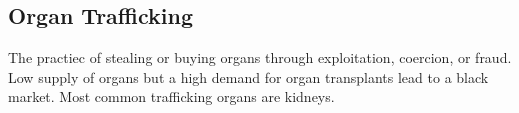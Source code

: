 \documentclass[12pt]{report}
\begin{document}
\subsection{Organ Trafficking}
\begin{definition}
    The practiec of stealing or buying organs through exploitation, coercion, or fraud. Low supply of organs but a high demand for organ transplants lead to a black market. Most common trafficking organs are kidneys.
\end{definition}
\end{document}
